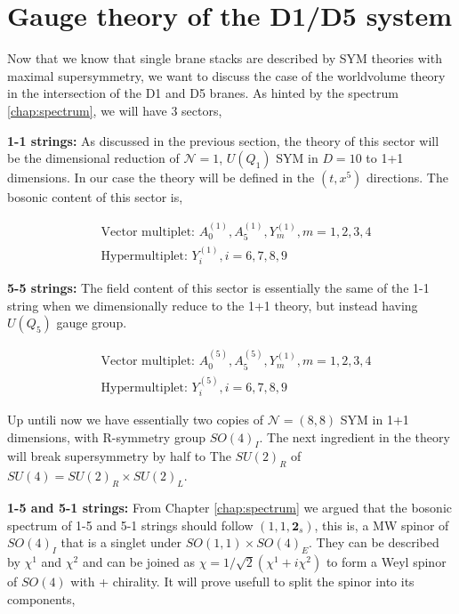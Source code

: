 \section{Gauge theory of the D1/D5 system}

Now that we know that single brane stacks are described by SYM theories with maximal supersymmetry, we want to discuss the case of the worldvolume theory in the intersection of the D1 and D5 branes. As hinted by the spectrum \ref{chap:spectrum}, we will have 3 sectors,

\textbf{1-1 strings: } As discussed in the previous section, the theory of this sector will be the dimensional reduction of $\mathcal{N} = 1$, $U(Q_1)$ SYM in $D=10$ to 1+1 dimensions. In our case the theory will be defined in the $(t,x^5)$ directions. The bosonic content of this sector is,

\begin{equation}
    \begin{aligned}
        &\text{Vector multiplet: }A_0^{(1)},A_5^{(1)},Y_m^{(1)},m=1,2,3,4 \\
        &\text{Hypermultiplet: }Y_i^{(1)},i=6,7,8,9    
    \end{aligned}
\end{equation}

\textbf{5-5 strings: } The field content of this sector is essentially the same of the 1-1 string when we dimensionally reduce to the 1+1 theory, but instead having $U(Q_5)$ gauge group. 

\begin{equation}
    \begin{aligned}
        &\text{Vector multiplet: }A_0^{(5)},A_5^{(5)},Y_m^{(1)},m=1,2,3,4 \\
        &\text{Hypermultiplet: }Y_i^{(5)},i=6,7,8,9    
    \end{aligned}
\end{equation}

Up untili now we have essentially two copies of $\mathcal{N}=(8,8)$ SYM in 1+1 dimensions, with R-symmetry group $SO(4)_I$. The next ingredient in the theory will break supersymmetry by half to The $SU(2)_R$ of $SU(4) = SU(2)_R \times SU(2)_L$.

\textbf{1-5 and 5-1 strings: } From Chapter \ref{chap:spectrum} we argued that the bosonic spectrum of 1-5 and 5-1 strings should follow $(1, 1, \mathbf{2}_s)$, this is, a MW spinor of $SO(4)_I$ that is a singlet under $SO(1,1) \times SO(4)_E$. They can be described by $\chi^1$ and $\chi^2$ and can be joined as $\chi = 1/\sqrt{2} (\chi^1 + i \chi^2)$ to form a Weyl spinor of $SO(4)$ with + chirality. It will prove usefull to split the spinor into its components,

